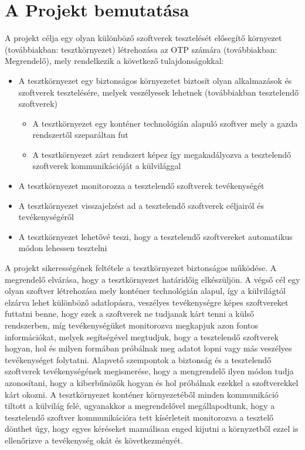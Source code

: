 \documentclass{scrreprt}
\begin{document}
\section{A Projekt bemutatása}
A projekt célja egy olyan különböző szoftverek tesztelését elősegítő környezet (továbbiakban: tesztkörnyezet) létrehozása az OTP számára (továbbiakban:
Megrendelő), mely rendelkezik a következő tulajdonságokkal:
\begin{itemize}
      \item A tesztkörnyezet egy biztonságos környezetet biztosít olyan alkalmazások és szoftverek tesztelésére, melyek veszélyesek lehetnek (továbbiakban tesztelendő
            szoftverek)
            \begin{itemize}
                  \item A tesztkörnyezet egy konténer technológián alapuló szoftver mely a gazda rendszertől szeparáltan fut
                  \item A tesztkörnyezet zárt rendszert képez így megakadályozva a tesztelendő szoftverek kommunikációját a külvilággal
            \end{itemize}
      \item A tesztkörnyezet monitorozza a tesztelendő szoftverek tevékenységét
      \item A tesztkörnyezet visszajelzést ad a tesztelendő szoftverek céljairól és tevékenységéről
      \item A tesztkörnyezet lehetővé teszi, hogy a tesztelendő szoftvereket automatikus módon lehessen tesztelni
\end{itemize}
A projekt sikerességének feltétele a tesztkörnyezet biztonságos működése.
A megrendelő elvárása, hogy a tesztkörnyezet határidőig elkészüljön. A végső cél egy olyan szoftver létrehozása mely konténer technológián alapul, így a külvilágtól elzárva lehet különböző adatlopásra, veszélyes tevékenységre képes szoftvereket futtatni benne, hogy ezek a szoftverek ne tudjanak kárt tenni a külső rendszerben, míg tevékenységüket monitorozva megkapjuk azon fontos információkat, melyek segítségével megtudjuk, hogy a tesztelendő szoftverek hogyan, hol és milyen formában próbálnak meg adatot lopni vagy más veszélyes tevékenységet folytatni.
\newline
Alapvető szempontok a biztonság és a tesztelendő szoftverek tevékenységének megismerése, hogy a mengrendelő ilyen módon tudja azonosítani, hogy a kiberbűnözők hogyan és hol próbálnak ezekkel a szoftverekkel kárt okozni.
A tesztkörnyezet konténer környezetéből minden kommunikáció tiltott a külvilág felé, ugyanakkor a megrendelővel megállapodtunk, hogy a tesztelendő szoftver kommunikációra tett kísérleteit monitorozva a tesztelő dönthet úgy, hogy egyes kéréseket manuálisan enged kijutni a környzetből ezzel is ellenőrizve a tevékenység okát és következményét.
\end{document}
